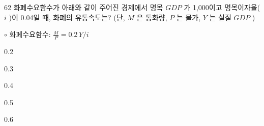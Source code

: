 \begin{question}{62}
화폐수요함수가 아래와 같이 주어진 경제에서 명목 $GDP$ 가 1,000이고 명목이자율( $i$ )이 0.04일 때, 화폐의 유통속도는? (단, $M$ 은 통화량, $P$ 는 물가, $Y$ 는 실질 $GDP$ )
\begin{framedtext}
$\circ$ 화폐수요함수: $\frac{M}{P}=0.2\,Y/i$
\end{framedtext}
\begin{choices}
  \item 0.2
  \item 0.3
  \item 0.4
  \item 0.5
  \item 0.6
\end{choices}
\end{question}
